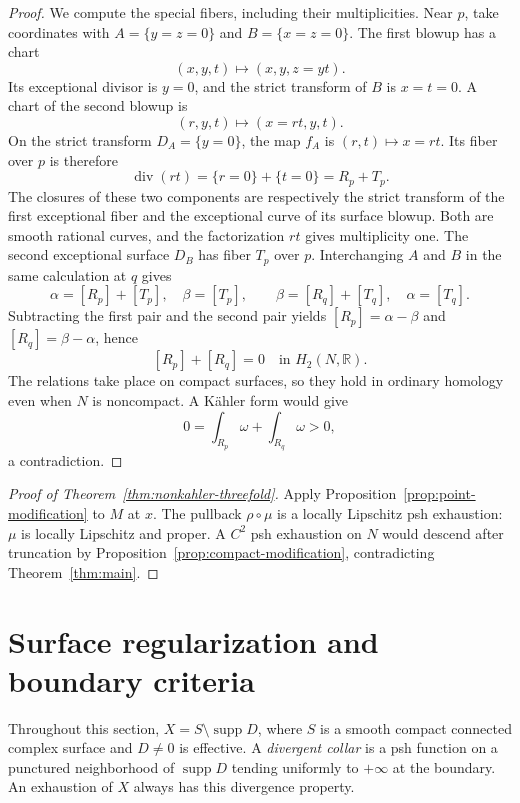 \documentclass[11pt]{amsart}
\theoremstyle{definition}
\theoremstyle{remark}
\numberwithin{equation}{section}
\newcommand{\R}{\mathbb R}
\newcommand{\supp}{\operatorname{supp}}
\begin{document}
\begin{proof}
We compute the special fibers, including their multiplicities.
Near $p$, take coordinates with
$A=\{y=z=0\}$ and $B=\{x=z=0\}$.
The first blowup has a chart
\[
 (x,y,t)\longmapsto(x,y,z=yt).
\]
Its exceptional divisor is $y=0$, and the strict transform of
$B$ is $x=t=0$. A chart of the second blowup is
\[
 (r,y,t)\longmapsto(x=rt,y,t).
\]
On the strict transform $D_A=\{y=0\}$, the map $f_A$ is
$(r,t)\mapsto x=rt$. Its fiber over $p$ is therefore
\[
 \operatorname{div}(rt)=\{r=0\}+\{t=0\}=R_p+T_p.
\]
The closures of these two components are respectively the strict
transform of the first exceptional fiber and the exceptional curve
of its surface blowup. Both are smooth rational curves, and the
factorization $rt$ gives multiplicity one. The second exceptional
surface $D_B$ has fiber $T_p$ over $p$. Interchanging $A$ and $B$
in the same calculation at $q$ gives
\[
 \alpha=[R_p]+[T_p],\quad\beta=[T_p],\qquad
 \beta=[R_q]+[T_q],\quad\alpha=[T_q].
\]
Subtracting the first pair and the second pair yields
$[R_p]=\alpha-\beta$ and $[R_q]=\beta-\alpha$, hence
\begin{equation}\label{eq:hironaka-zero-cycle}
 [R_p]+[R_q]=0\quad\text{in }H_2(N,\R).
\end{equation}
The relations take place on compact surfaces, so they hold in
ordinary homology even when $N$ is noncompact. A K\"ahler form
would give
\[
 0=\int_{R_p}\omega+\int_{R_q}\omega>0,
\]
a contradiction.
\end{proof}

\begin{proof}[Proof of Theorem~\ref{thm:nonkahler-threefold}]
Apply Proposition~\ref{prop:point-modification} to $M$ at $x$.
The pullback $\rho\circ\mu$ is a locally Lipschitz psh exhaustion:
$\mu$ is locally Lipschitz and proper. A $C^2$ psh exhaustion on
$N$ would descend after truncation by
Proposition~\ref{prop:compact-modification}, contradicting
Theorem~\ref{thm:main}.
\end{proof}

\section{Surface regularization and boundary criteria}\label{sec:surfaces}
Throughout this section, $X=S\setminus\supp D$, where $S$ is a smooth
compact connected complex surface and $D\ne0$ is effective. A
\emph{divergent collar} is a psh function on a punctured neighborhood
of $\supp D$ tending uniformly to $+\infty$ at the boundary.
An exhaustion of $X$ always has this divergence property.
\end{document}
